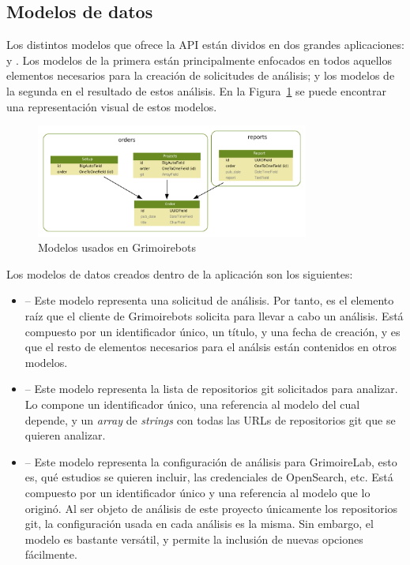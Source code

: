 \subsection{Modelos de datos} \label{sec:modelos-de-datos}

Los distintos modelos que ofrece la API están dividos en dos grandes aplicaciones:  y . Los modelos de la primera están principalmente enfocados en todos aquellos elementos necesarios para la creación de solicitudes de análisis; y los modelos de la segunda en el resultado de estos análisis. En la Figura~{\ref{fig:grimoirebots_models}} se puede encontrar una representación visual de estos modelos.

\begin{figure}[ht]
    \centering
    \includegraphics[width=0.8\textwidth]{Figures/grimoirebots_ii_models}
    \decoRule
    \caption[Grimoirebots (modelos)]{Modelos usados en Grimoirebots}
    \label{fig:grimoirebots_models}
\end{figure}

Los modelos de datos creados dentro de la aplicación  son los siguientes:

\begin{itemize}
    \item {} -- Este modelo representa una solicitud de análisis. Por tanto, es el elemento raíz que el cliente de Grimoirebots solicita para llevar a cabo un análisis. Está compuesto por un identificador único, un título, y una fecha de creación, y es que el resto de elementos necesarios para el análsis están contenidos en otros modelos.
    \item {} -- Este modelo representa la lista de repositorios git solicitados para analizar. Lo compone un identificador único, una referencia al modelo  del cual depende, y un \emph{array} de \emph{strings} con todas las URLs de repositorios git que se quieren analizar.
    \item {} -- Este modelo representa la configuración de análisis para GrimoireLab, esto es, qué estudios se quieren incluir, las credenciales de OpenSearch, etc. Está compuesto por un identificador único y una referencia al modelo  que lo originó. Al ser objeto de análisis de este proyecto únicamente los repositorios git, la configuración usada en cada análisis es la misma. Sin embargo, el modelo es bastante versátil, y permite la inclusión de nuevas opciones fácilmente.
\end{itemize}

